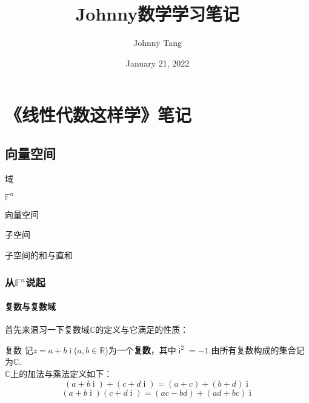 \documentclass[lang=cn, zihao=5]{elegantbook}
\title{Johnny数学学习笔记}
\subtitle
\author{Johnny Tang}
\institute{DEEP Team}
\date{January 21, 2022}
\newcommand{\R}{\mathbb{R}}
\newcommand{\C}{\mathbb{C}}
\newcommand{\F}{\mathbb{F}}
\DeclareMathOperator{\ic}{i}
\begin{document}
\maketitle

\frontmatter

\mainmatter

\tableofcontents

\part{《线性代数这样学》笔记}

\chapter{向量空间}
\begin{introduction}
	\item 域
	\item $\F ^{n}$
	\item 向量空间
	\item 子空间
	\item 子空间的和与直和
\end{introduction}

\section{从$\F ^{n}$说起}

\subsection{复数与复数域}

首先来温习一下复数域$\C$的定义与它满足的性质：

\begin{definition}{复数}
	记$z=a+b\ic $($a,b \in \R$)为一个\textbf{复数}，其中$\ic ^2=-1$.由所有复数构成的集合记为$\C$. \\
	$\C$上的加法与乘法定义如下：
	$$(a+b\ic ) + (c+d\ic ) = (a+c) + (b+d)\ic $$
	$$(a+b\ic )(c+d\ic ) = (ac-bd) + (ad+bc)\ic $$
\end{definition}
\end{document}
